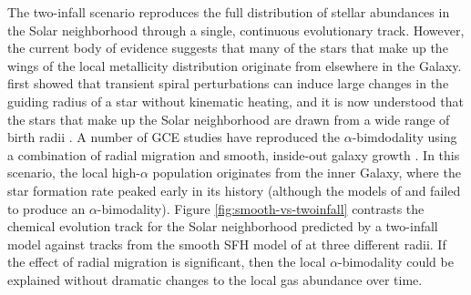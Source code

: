 \documentclass[twocolumn,twocolappendix,linenumbers]{aastex631}
\begin{document}
The two-infall scenario reproduces the full distribution of stellar abundances in the Solar neighborhood through a single, continuous evolutionary track. However, the current body of evidence suggests that many of the stars that make up the wings of the local metallicity distribution originate from elsewhere in the Galaxy. \citet{sellwood_radial_2002} first showed that transient spiral perturbations can induce large changes in the guiding radius of a star without kinematic heating, and it is now understood that the stars that make up the Solar neighborhood are drawn from a wide range of birth radii \citep[e.g.,][]{schonrich_chemical_2009,frankel_measuring_2018,lian_quantifying_2022,lehmann_probing_2024}. 
A number of GCE studies have reproduced the $\alpha$-bimdodality using a combination of radial migration and smooth, inside-out galaxy growth \citep[e.g.,][]{schonrich_chemical_2009,kubryk_evolution_2015,sharma_chemical_2021,chen_chemical_2023,prantzos_origin_2023}. In this scenario, the local high-$\alpha$ population originates from the inner Galaxy, where the star formation rate peaked early in its history (although the models of \citealt{johnson_stellar_2021} and \citealt{dubay_galactic_2024} failed to produce an $\alpha$-bimodality).
Figure \ref{fig:smooth-vs-twoinfall} contrasts the chemical evolution track for the Solar neighborhood predicted by a two-infall model against tracks from the smooth SFH model of \citet{johnson_stellar_2021} at three different radii. 
If the effect of radial migration is significant, then the local $\alpha$-bimodality could be explained without dramatic changes to the local gas abundance over time.
\end{document}
